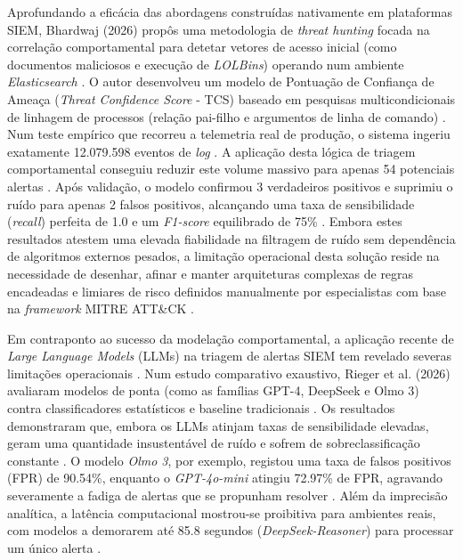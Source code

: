 \documentclass[12pt,a4paper]{article}
\begin{document}
Aprofundando a eficácia das abordagens construídas nativamente em plataformas SIEM, Bhardwaj (2026) propôs uma metodologia de \textit{threat hunting} focada na correlação comportamental para detetar vetores de acesso inicial (como documentos maliciosos e execução de \textit{LOLBins}) operando num ambiente \textit{Elasticsearch} \cite{bhardwaj2026}. O autor desenvolveu um modelo de Pontuação de Confiança de Ameaça (\textit{Threat Confidence Score} - TCS) baseado em pesquisas multicondicionais de linhagem de processos (relação pai-filho e argumentos de linha de comando) \cite{bhardwaj2026}. Num teste empírico que recorreu a telemetria real de produção, o sistema ingeriu exatamente 12.079.598 eventos de \textit{log} \cite{bhardwaj2026}. A aplicação desta lógica de triagem comportamental conseguiu reduzir este volume massivo para apenas 54 potenciais alertas \cite{bhardwaj2026}. Após validação, o modelo confirmou 3 verdadeiros positivos e suprimiu o ruído para apenas 2 falsos positivos, alcançando uma taxa de sensibilidade (\textit{recall}) perfeita de 1.0 e um \textit{F1-score} equilibrado de 75\% \cite{bhardwaj2026}. Embora estes resultados atestem uma elevada fiabilidade na filtragem de ruído sem dependência de algoritmos externos pesados, a limitação operacional desta solução reside na necessidade de desenhar, afinar e manter arquiteturas complexas de regras encadeadas e limiares de risco definidos manualmente por especialistas com base na \textit{framework} MITRE ATT\&CK \cite{bhardwaj2026}.

Em contraponto ao sucesso da modelação comportamental, a aplicação recente de \textit{Large Language Models} (LLMs) na triagem de alertas SIEM tem revelado severas limitações operacionais \cite{rieger2026}. Num estudo comparativo exaustivo, Rieger et al. (2026) avaliaram modelos de ponta (como as famílias GPT-4, DeepSeek e Olmo 3) contra classificadores estatísticos e baseline tradicionais \cite{rieger2026}. Os resultados demonstraram que, embora os LLMs atinjam taxas de sensibilidade elevadas, geram uma quantidade insustentável de ruído e sofrem de sobreclassificação constante \cite{rieger2026}. O modelo \textit{Olmo 3}, por exemplo, registou uma taxa de falsos positivos (FPR) de 90.54\%, enquanto o \textit{GPT-4o-mini} atingiu 72.97\% de FPR, agravando severamente a fadiga de alertas que se propunham resolver \cite{rieger2026}. Além da imprecisão analítica, a latência computacional mostrou-se proibitiva para ambientes reais, com modelos a demorarem até 85.8 segundos (\textit{DeepSeek-Reasoner}) para processar um único alerta \cite{rieger2026}.
\end{document}
